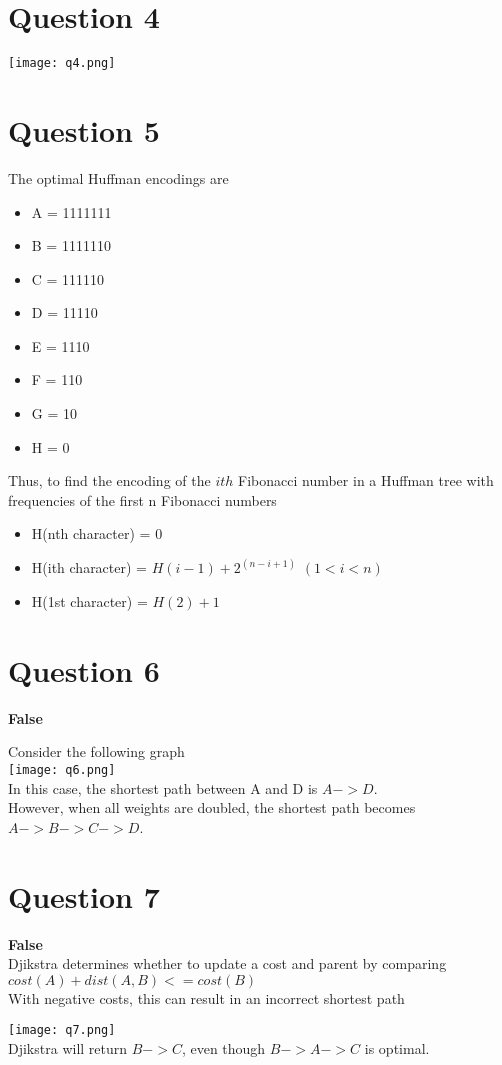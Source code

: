 \documentclass{article}
\begin{document}
	\section{Question 4}
	\begin{center}
		\texttt{[image: q4.png]}
	\end{center}

	\section{Question 5}
	The optimal Huffman encodings are
	\begin{itemize}
		\item A = 1111111
		\item B = 1111110
		\item C = 111110
		\item D = 11110
		\item E = 1110
		\item F = 110
		\item G = 10
		\item H = 0
	\end{itemize}
	Thus, to find the encoding of the $ith$ Fibonacci number in a Huffman tree with frequencies of the first n Fibonacci numbers
	\begin{itemize}
		\item H(nth character) = $0$
		\item H(ith character) = $H(i-1) + 2^{(n - i + 1)}$ $(1 < i < n)$
		\item H(1st character) = $H(2) + 1$
	\end{itemize}

	\section{Question 6}
	\textbf{False} \\ 
	\begin{center}
		Consider the following graph \\
		\texttt{[image: q6.png]} \\
		In this case, the shortest path between A and D is $A->D$. \\
		However, when all weights are doubled, the shortest path becomes $A->B->C->D$.
	\end{center}
	
	
	\section{Question 7}
	\textbf{False} \\ 
	Djikstra determines whether to update a cost and parent by comparing $cost(A) + dist(A,B) <= cost(B)$ \\
	With negative costs, this can result in an incorrect shortest path 
	\begin{center}
		\texttt{[image: q7.png]} \\ 
		Djikstra will return $B->C$, even though $B->A->C$ is optimal.
	\end{center}
\end{document}
